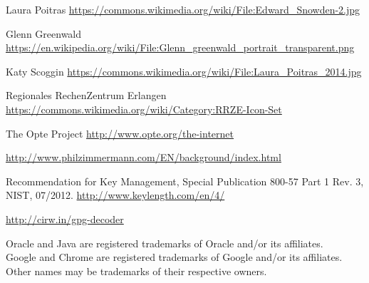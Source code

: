 \documentclass{beamer}
\begin{document}


  
\begin{frame}

\begin{thebibliography}{1}
\scriptsize

	 Laura Poitras \url{https://commons.wikimedia.org/wiki/File:Edward_Snowden-2.jpg} 
	
	 Glenn Greenwald  \url{https://en.wikipedia.org/wiki/File:Glenn_greenwald_portrait_transparent.png}
	
	 Katy Scoggin \url{https://commons.wikimedia.org/wiki/File:Laura_Poitras_2014.jpg}
	
	 Regionales RechenZentrum Erlangen  \url{https://commons.wikimedia.org/wiki/Category:RRZE-Icon-Set}
	
	  The Opte Project \url{http://www.opte.org/the-internet}
	
	 \url{http://www.philzimmermann.com/EN/background/index.html}
	
	 Recommendation for Key Management, Special Publication 800-57 Part 1 Rev. 3, NIST, 07/2012. \url{http://www.keylength.com/en/4/}
	
	 \url{http://cirw.in/gpg-decoder}

\end{thebibliography}
\end{frame}

\begin{frame}
	
	\tiny
	Oracle and Java are registered trademarks of Oracle and/or its affiliates. \\
	Google and Chrome are registered trademarks of Google and/or its affiliates. \\
	Other names may be trademarks of their respective owners.

\end{frame}
\end{document}
